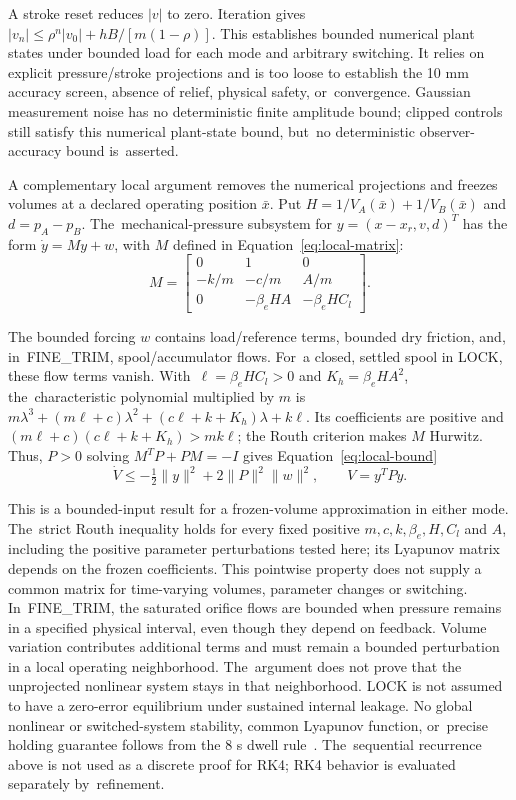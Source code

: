 \documentclass[machines,article,submit,pdftex,moreauthors]{Definitions/mdpi}
\begin{document}
A stroke reset reduces $|v|$ to zero. Iteration gives $|v_n|\le\rho^n|v_0|+hB/[m(1-\rho)]$. This establishes bounded numerical plant states under bounded load for each mode and arbitrary switching. It relies on explicit pressure/stroke projections and is too loose to establish the 10 mm accuracy screen, absence of relief, physical safety, or~convergence. Gaussian measurement noise has no deterministic finite amplitude bound; clipped controls still satisfy this numerical plant-state bound, but~no deterministic observer-accuracy bound is~asserted.

A complementary local argument removes the numerical projections and freezes volumes at a declared operating position $\bar x$. Put $H=1/V_A(\bar x)+1/V_B(\bar x)$ and $d=p_A-p_B$. The~mechanical-pressure subsystem for $y=(x-x_r,v,d)^T$ has the form $\dot y=My+w$, with $M$ defined in Equation~\eqref{eq:local-matrix}:
\begin{equation}
M=\begin{bmatrix}0&1&0\\-k/m&-c/m&A/m\\0&-\beta_e HA&-\beta_e HC_l\end{bmatrix}.
\label{eq:local-matrix}
\end{equation}

The bounded forcing $w$ contains load/reference terms, bounded dry friction, and, in~FINE\_TRIM, spool/accumulator flows. For~a closed, settled spool in LOCK, these flow terms vanish. With~$\ell=\beta_e HC_l>0$ and $K_h=\beta_e HA^2$, the~characteristic polynomial multiplied by $m$ is $m\lambda^3+(m\ell+c)\lambda^2+(c\ell+k+K_h)\lambda+k\ell$. Its coefficients are positive and $(m\ell+c)(c\ell+k+K_h)>mk\ell$; the Routh criterion makes $M$ Hurwitz. Thus, $P>0$ solving $M^TP+PM=-I$ gives Equation~\eqref{eq:local-bound}
\begin{equation}
\dot V\le-\tfrac12\|y\|^2+2\|P\|^2\|w\|^2,\qquad V=y^TPy.
\label{eq:local-bound}
\end{equation}

This is a bounded-input result for a frozen-volume approximation in either mode. The~strict Routh inequality holds for every fixed positive $m,c,k,\beta_e,H,C_l$ and $A$, including the positive parameter perturbations tested here; its Lyapunov matrix depends on the frozen coefficients. This pointwise property does not supply a common matrix for time-varying volumes, parameter changes or switching. In~FINE\_TRIM, the saturated orifice flows are bounded when pressure remains in a specified physical interval, even though they depend on feedback. Volume variation contributes additional terms and must remain a bounded perturbation in a local operating neighborhood. The~argument does not prove that the unprojected nonlinear system stays in that neighborhood. LOCK is not assumed to have a zero-error equilibrium under sustained internal leakage. No global nonlinear or switched-system stability, common Lyapunov function, or~precise holding guarantee follows from the 8 s dwell rule~\cite{liberzon1999,hespanha1999,goebel2009}. The~sequential recurrence above is not used as a discrete proof for RK4; RK4 behavior is evaluated separately by~refinement.
\end{document}
